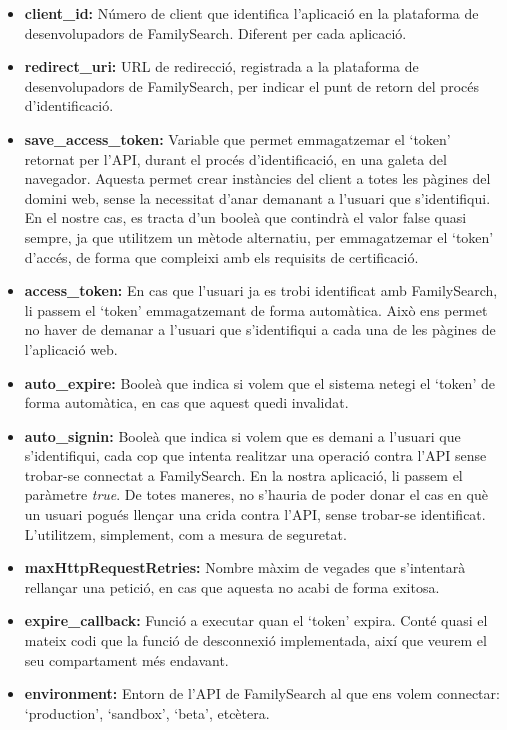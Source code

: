 \begin{itemize}
    \item \textbf{client\_id:} Número de client que identifica l'aplicació en la plataforma de desenvolupadors de FamilySearch. Diferent per cada aplicació.
    \item \textbf{redirect\_uri:} URL de redirecció, registrada a la plataforma de desenvolupadors de FamilySearch, per indicar el punt de retorn del procés d'identificació.
    \item \textbf{save\_access\_token:} Variable que permet emmagatzemar el `token' retornat per l'API, durant el procés d'identificació, en una galeta del navegador. Aquesta permet crear instàncies del client a totes les pàgines del domini web, sense la necessitat d'anar demanant a l'usuari que s'identifiqui. En el nostre cas, es tracta d'un booleà que contindrà el valor false quasi sempre, ja que uti\-lit\-zem un mètode alternatiu, per emmagatzemar el `token' d'accés, de forma que compleixi amb els requisits de certificació.
    \item \textbf{access\_token:} En cas que l'usuari ja es trobi identificat amb FamilySearch, li passem el `token' emmagatzemant de forma automàtica. Això ens permet no haver de demanar a l'usuari que s'identifiqui a cada una de les pàgines de l'aplicació web.
    \item \textbf{auto\_expire:} Booleà que indica si volem que el sistema netegi el `token' de forma automàtica, en cas que aquest quedi invalidat.
    \item \textbf{auto\_signin:} Booleà que indica si volem que es demani a l'usuari que s'iden\-ti\-fi\-qui, cada cop que intenta realitzar una operació contra l'API sense trobar-se connectat a FamilySearch. En la nostra aplicació, li passem el paràmetre \emph{true}. De totes maneres, no s'hauria de poder donar el cas en què un usuari pogués llençar una crida contra l'API, sense trobar-se identificat. L'utilitzem, simplement, com a mesura de seguretat.
    \item \textbf{maxHttpRequestRetries:} Nombre màxim de vegades que s'intentarà re\-llan\-çar una petició, en cas que aquesta no acabi de forma exitosa.
    \item \textbf{expire\_callback:} Funció a executar quan el `token' expira. Conté quasi el mateix codi que la funció de desconnexió implementada, així que veurem el seu compartament més endavant.
    \item \textbf{environment:} Entorn de l'API de FamilySearch al que ens volem connectar: `production', `sandbox', `beta', etcètera.
\end{itemize}

